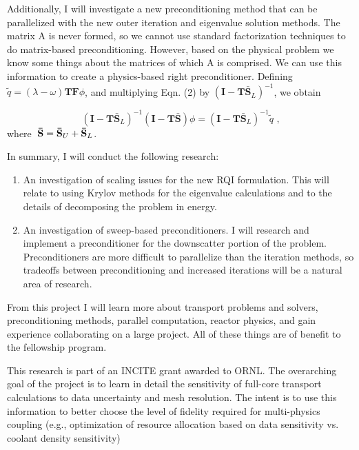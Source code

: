 \documentclass[12pt, letterpaper]{article}
\begin{document}
    Additionally, I will investigate a new preconditioning method that can be parallelized with the new outer iteration and eigenvalue solution methods. The matrix A is never formed, so we cannot use standard factorization techniques to do matrix-based preconditioning. However, based on the physical problem we know some things about the matrices of which A is comprised. We can use this information to create a physics-based right preconditioner. Defining $\tilde{q} = (\lambda - \omega) \mathbf{TF}\phi$, and multiplying Eqn. (2) by $(\mathbf{I} - \mathbf{T\bar{S}}_{L})^{-1}$, we obtain

\begin{equation}
   (\mathbf{I} -\mathbf{T\bar{S}}_{L})^{-1} (\mathbf{I} -\mathbf{T\bar{S}}) \phi = (\mathbf{I} - \mathbf{T\bar{S}}_{L})^{-1} \tilde{q} \text{ ,}
\end{equation}
where $\hspace{0.1cm}\mathbf{\bar{S}} = \mathbf{\bar{S}}_{U} + \mathbf{\bar{S}}_{L}$.

In summary, I will conduct the following research: 
\begin{enumerate}
\item An investigation of scaling issues for the new RQI formulation. This will relate to using Krylov methods for the eigenvalue calculations and to the details of decomposing the problem in energy. 
\item An investigation of sweep-based preconditioners. I will research and implement a preconditioner for the downscatter portion of the problem. Preconditioners are more difficult to parallelize than the iteration methods, so tradeoffs between preconditioning and increased iterations will be a natural area of research. 
\end{enumerate}

    
From this project I will learn more about transport problems and solvers, preconditioning methods, parallel computation, reactor physics, and gain experience collaborating on a large project. All of these things are of benefit to the fellowship program. 

    This research is part of an INCITE grant awarded to ORNL. The overarching goal of the project is to learn in detail the sensitivity of full-core transport calculations to data uncertainty and mesh resolution. The intent is to use this information to better choose the level of fidelity required for multi-physics coupling (e.g., optimization of resource allocation based on data sensitivity vs. coolant density sensitivity)
\end{document}

